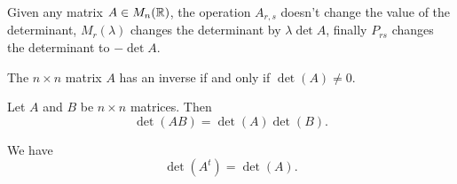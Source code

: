 \documentclass[10pt, a4paper]{article}
\begin{document}
\begin{remark}
    Given any matrix $A \in M_n(\mathbb{R})$,
    the operation $A_{r, s}$ doesn't change the value of the determinant,
    $M_{r}(\lambda)$ changes the determinant by $\lambda\det{A}$,
    finally $P_{rs}$ changes the determinant to $-\det{A}$.
\end{remark}

\begin{theorem}
    The $n \times n$ matrix $A$ has an inverse if and only if $\det(A) \neq 0$.
\end{theorem}

\begin{theorem}
    Let $A$ and $B$ be $n \times n$ matrices.
    Then
    \[
    \det(AB) = \det(A)\det(B).
    \]
\end{theorem}

\begin{theorem}
    We have
    \[
    \det(A ^ t) = \det(A).
    \]
\end{theorem}
\end{document}
